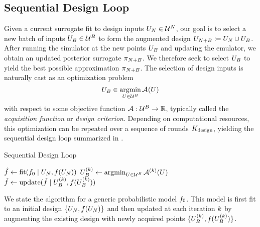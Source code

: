 \documentclass[12pt]{article}
\begin{document}
\subsection{Sequential Design Loop}
Given a current surrogate fit to design inputs $\designIn[\Ndesign] \in \parSpace^{\Ndesign}$,
our goal is to select a new batch of inputs $\designBatchIn \in \parSpace^{\Nbatch}$
to form the augmented design $\designIn[\Naugment] \Def \designIn[\Ndesign] \cup \designBatchIn$.
After running the simulator at the new points $\designBatchIn$ and updating the emulator, we obtain
an updated posterior surrogate $\postEm[\Naugment]$. We therefore seek to select $\designBatchIn$
to yield the best possible approximation $\postEm[\Naugment]$. The selection of design inputs is naturally
cast as an optimization problem 
\begin{equation}
\designBatchIn \in \argmin_{\parMat \in \parSpace^{\Nbatch}} \acq[](\parMat)
\label{eq:acq-opt}
\end{equation}
with respect to some objective function $\acq[]: \parSpace^{\Nbatch} \to \R$, typically
called the \textit{acquisition function} or \textit{design criterion}.
Depending on computational resources, this optimization can be repeated over a sequence of 
rounds $\Nrounds$, yielding the sequential design loop summarized in .
\begin{algorithm}
    \caption{Sequential Design Loop}
    \label{alg:seq-des-loop}
    \begin{algorithmic}[1] %
    	\State $\hat{\func} \gets \mathrm{fit}(\funcPrior \given \designIn[\Ndesign], \func(\designIn[\Ndesign]))$
         
        		\State $\designBatchIn^{(\designIndex)} \gets \argmin_{\parMat \in \parSpace^{\Nbatch}} \acq[]^{(\designIndex)}(\parMat)$ 
		\State $\hat{f} \gets \mathrm{update}(\hat{f} \given \designBatchIn^{(\designIndex)}, \func(\designBatchIn^{(\designIndex)}))$
	\EndFor
	\EndFunction
    \end{algorithmic}
\end{algorithm}
We state the algorithm for a generic probabilistic model $\funcPrior$. 
This model is first fit to an initial design $\{\designIn[\Ndesign], \func(\designIn[\Ndesign])\}$ and then 
updated at each iteration $\designIndex$ by augmenting the existing design with newly 
acquired points $\{\designBatchIn^{(\designIndex)}, \func(\designBatchIn^{(\designIndex)})\}$.
\end{document}
